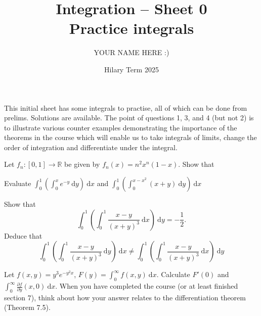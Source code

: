 \documentclass[answers]{exam}
\title{Integration -- Sheet 0\\Practice integrals}
\author{YOUR NAME HERE :)}
\date{Hilary Term 2025}
\begin{document}
\maketitle

This initial sheet has some integrals to practise, all of which can be done from prelims. Solutions are available. The point of questions 1, 3, and 4 (but not 2) is to illustrate various counter examples demonstrating the importance of the theorems in the course which will enable us to take integrals of limits, change the order of integration and differentiate under the integral.

\begin{questions}

\question%
Let $f_{n}:[0,1] \to \mathbb{R}$ be given by $f_{n}(x)=n^{2} x^{n}(1-x)$. Show that



\question%
Evaluate $\displaystyle\int_{0}^{1}\left(\int_{0}^{x} e^{-y} ~\mathrm dy\right)~\mathrm d x$ and $\displaystyle\int_{0}^{1}\left(\int_{0}^{x-x^{2}}(x+y) ~\mathrm d y\right)~\mathrm d x$



\question%
Show that \[
	\int_{0}^{1}\left(\int_{0}^{1} \frac{x-y}{(x+y)^{3}}~\mathrm d x\right)~\mathrm d y=-\frac{1}{2}.
\] Deduce that \[
	\int_{0}^{1}\left(\int_{0}^{1} \frac{x-y}{(x+y)^{3}}~\mathrm d y\right)~\mathrm d x \neq \int_{0}^{1}\left(\int_{0}^{1} \frac{x-y}{(x+y)^{3}}~\mathrm d x\right)~\mathrm d y
\]



\question%
Let $f(x, y)=y^{3} e^{-y^{2} x}$, $F(y)=\int_{0}^{\infty} f(x, y)~\mathrm d x$. Calculate $F'(0)$ and $\int_{0}^{\infty} \frac{\partial f}{\partial y}(x, 0)~\mathrm d x$.
When you have completed the course (or at least finished section 7), think about how your answer relates to the differentiation theorem (Theorem 7.5).

\end{questions}
\end{document}

